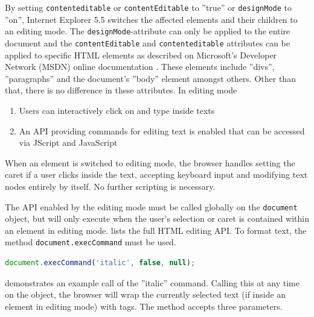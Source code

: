 By setting \texttt{contenteditable} or \texttt{contentEditable} to ''true'' or \texttt{designMode} to ''on'', Internet Explorer 5.5 switches the affected elements and their children to an editing mode. The \texttt{designMode}-attribute can only be applied to the entire document and the \texttt{contentEditable} and \texttt{contenteditable} attributes can be applied to specific HTML elements as described on Microsoft's Developer Network (MSDN) online documentation \cite{ac2}. These elements include ''divs'', ''paragraphs'' and the document's ''body'' element amongst others. Other than that, there is no difference in these attributes. In editing mode


\begin{enumerate}
\item Users can interactively click on and type inside texts
\item An API providing commands for editing text is enabled that can be accessed via JScript and JavaScript
\end{enumerate}

When an element is switched to editing mode, the browser handles setting the caret if a user clicks inside the text, accepting keyboard input and modifying text nodes entirely by itself. No further scripting is necessary.

The API enabled by the editing mode must be called globally on the \texttt{document} object, but will only execute when the user's selection or caret is contained within an element in editing mode.  lists the full HTML editing API. To format text, the method \texttt{document.execCommand} must be used.

\begin{lstlisting}[language=JavaScript, caption=Emphasizing text using the HTML editing API, label=lst:execcommand-italics]
document.execCommand('italic', false, null);
\end{lstlisting}

 demonstrates an example call of the ''italic'' command. Calling this at any time on the  object, the browser will wrap the currently selected text (if inside an element in editing mode) with  tags. The method accepts three parameters.

